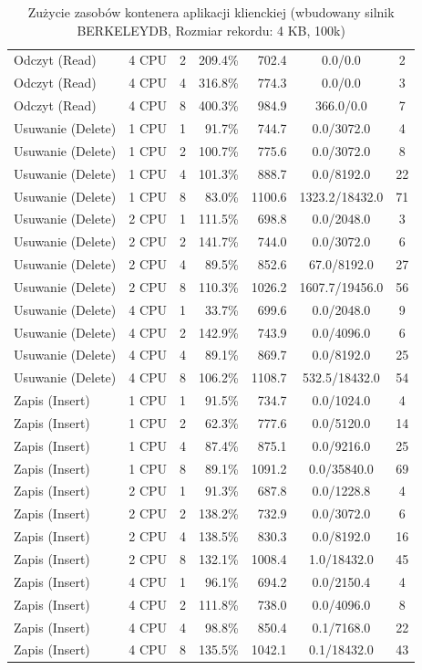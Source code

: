\begin{table}[ht]
{\begin{tabular}{llcrrcc}
Odczyt (Read) & 4 CPU & 2 & 209.4\% & 702.4 & 0.0/0.0 & 2 \\
Odczyt (Read) & 4 CPU & 4 & 316.8\% & 774.3 & 0.0/0.0 & 3 \\
Odczyt (Read) & 4 CPU & 8 & 400.3\% & 984.9 & 366.0/0.0 & 7 \\
Usuwanie (Delete) & 1 CPU & 1 & 91.7\% & 744.7 & 0.0/3072.0 & 4 \\
Usuwanie (Delete) & 1 CPU & 2 & 100.7\% & 775.6 & 0.0/3072.0 & 8 \\
Usuwanie (Delete) & 1 CPU & 4 & 101.3\% & 888.7 & 0.0/8192.0 & 22 \\
Usuwanie (Delete) & 1 CPU & 8 & 83.0\% & 1100.6 & 1323.2/18432.0 & 71 \\
Usuwanie (Delete) & 2 CPU & 1 & 111.5\% & 698.8 & 0.0/2048.0 & 3 \\
Usuwanie (Delete) & 2 CPU & 2 & 141.7\% & 744.0 & 0.0/3072.0 & 6 \\
Usuwanie (Delete) & 2 CPU & 4 & 89.5\% & 852.6 & 67.0/8192.0 & 27 \\
Usuwanie (Delete) & 2 CPU & 8 & 110.3\% & 1026.2 & 1607.7/19456.0 & 56 \\
Usuwanie (Delete) & 4 CPU & 1 & 33.7\% & 699.6 & 0.0/2048.0 & 9 \\
Usuwanie (Delete) & 4 CPU & 2 & 142.9\% & 743.9 & 0.0/4096.0 & 6 \\
Usuwanie (Delete) & 4 CPU & 4 & 89.1\% & 869.7 & 0.0/8192.0 & 25 \\
Usuwanie (Delete) & 4 CPU & 8 & 106.2\% & 1108.7 & 532.5/18432.0 & 54 \\
Zapis (Insert) & 1 CPU & 1 & 91.5\% & 734.7 & 0.0/1024.0 & 4 \\
Zapis (Insert) & 1 CPU & 2 & 62.3\% & 777.6 & 0.0/5120.0 & 14 \\
Zapis (Insert) & 1 CPU & 4 & 87.4\% & 875.1 & 0.0/9216.0 & 25 \\
Zapis (Insert) & 1 CPU & 8 & 89.1\% & 1091.2 & 0.0/35840.0 & 69 \\
Zapis (Insert) & 2 CPU & 1 & 91.3\% & 687.8 & 0.0/1228.8 & 4 \\
Zapis (Insert) & 2 CPU & 2 & 138.2\% & 732.9 & 0.0/3072.0 & 6 \\
Zapis (Insert) & 2 CPU & 4 & 138.5\% & 830.3 & 0.0/8192.0 & 16 \\
Zapis (Insert) & 2 CPU & 8 & 132.1\% & 1008.4 & 1.0/18432.0 & 45 \\
Zapis (Insert) & 4 CPU & 1 & 96.1\% & 694.2 & 0.0/2150.4 & 4 \\
Zapis (Insert) & 4 CPU & 2 & 111.8\% & 738.0 & 0.0/4096.0 & 8 \\
Zapis (Insert) & 4 CPU & 4 & 98.8\% & 850.4 & 0.1/7168.0 & 22 \\
Zapis (Insert) & 4 CPU & 8 & 135.5\% & 1042.1 & 0.1/18432.0 & 43 \\
\bottomrule
\end{tabular}%
}
\caption{Zużycie zasobów kontenera aplikacji klienckiej (wbudowany silnik BERKELEYDB, Rozmiar rekordu: 4 KB, 100k)}
\label{tab:resources_berkeleydb_medium_100000}
\end{table}
